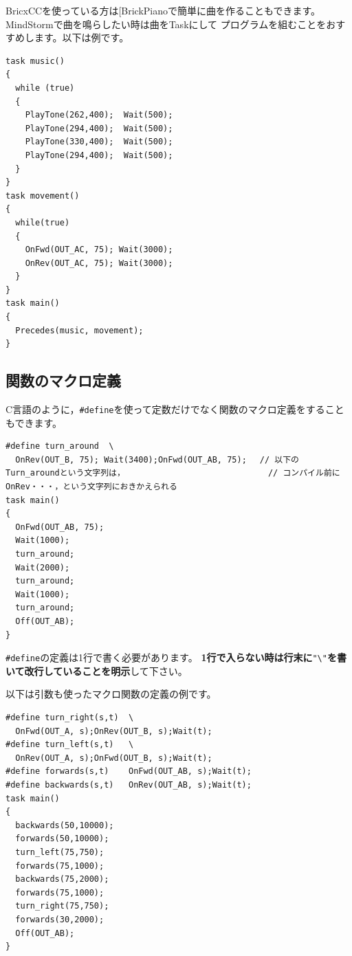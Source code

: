 \documentclass[11pt]{jarticle}
\makeatletter
\def\nmindex{\@ifnextchar[{\@nmindex}{\@@nmindex}}
\def\@nmindex[#1]#2{#2\index{#1@#2}}
\def\@@nmindex#1{#1\index{#1}}
\makeatother
\begin{document}
BricxCCを使っている方は\nmindex{BrickPiano}で簡単に曲を作ることもできます。MindStormで曲を鳴らしたい時は曲をTaskにして
プログラムを組むことをおすすめします。以下は例です。

\begin{screen}{\small
\begin{verbatim}
task music() 
{ 
  while (true) 
  { 
    PlayTone(262,400);  Wait(500); 
    PlayTone(294,400);  Wait(500); 
    PlayTone(330,400);  Wait(500); 
    PlayTone(294,400);  Wait(500); 
  } 
} 
task movement() 
{ 
  while(true) 
  { 
    OnFwd(OUT_AC, 75); Wait(3000); 
    OnRev(OUT_AC, 75); Wait(3000); 
  } 
} 
task main() 
{ 
  Precedes(music, movement); 
} 
\end{verbatim}}
\end{screen}


\subsection{関数のマクロ定義}
C言語のように，\verb|#define|を使って定数だけでなく関数のマクロ定義をすることもできます。

\begin{screen}{\small
\begin{verbatim}
#define turn_around  \ 
  OnRev(OUT_B, 75); Wait(3400);OnFwd(OUT_AB, 75); 　// 以下のTurn_aroundという文字列は，　　　　　　　　　　　　　　　　　　// コンパイル前にOnRev・・・，という文字列におきかえられる
task main() 
{ 
  OnFwd(OUT_AB, 75); 
  Wait(1000); 
  turn_around; 
  Wait(2000); 
  turn_around; 
  Wait(1000); 
  turn_around; 
  Off(OUT_AB); 
} 
\end{verbatim}}
\end{screen}

\verb|#define|の定義は1行で書く必要があります。
\textbf{1行で入らない時は行末に}\verb|"\"|\textbf{を書いて改行していることを明示}して下さい。

以下は引数も使ったマクロ関数の定義の例です。

\begin{screen}{\small
\begin{verbatim}
#define turn_right(s,t)  \ 
  OnFwd(OUT_A, s);OnRev(OUT_B, s);Wait(t); 
#define turn_left(s,t)   \ 
  OnRev(OUT_A, s);OnFwd(OUT_B, s);Wait(t); 
#define forwards(s,t)    OnFwd(OUT_AB, s);Wait(t); 
#define backwards(s,t)   OnRev(OUT_AB, s);Wait(t); 
task main() 
{ 
  backwards(50,10000); 
  forwards(50,10000); 
  turn_left(75,750); 
  forwards(75,1000); 
  backwards(75,2000); 
  forwards(75,1000); 
  turn_right(75,750); 
  forwards(30,2000); 
  Off(OUT_AB); 
} 
\end{verbatim}}
\end{screen}
\end{document}
